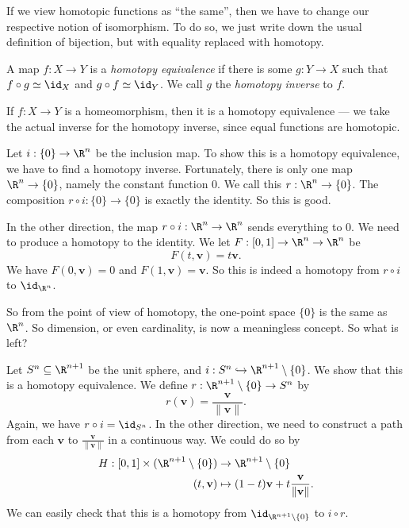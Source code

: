 \documentclass[a4paper]{article}
\begin{document}
If we view homotopic functions as ``the same'', then we have to change our respective notion of isomorphism. To do so, we just write down the usual definition of bijection, but with equality replaced with homotopy.

\begin{defi}
  A map $f: X \to Y$ is a \emph{homotopy equivalence} if there is some $g: Y \to X$ such that $f \circ g \simeq \id_X$ and $g \circ f \simeq \id_Y$. We call $g$ the \emph{homotopy inverse} to $f$.
\end{defi}

\begin{eg}
  If $f: X \to Y$ is a homeomorphism, then it is a homotopy equivalence --- we take the actual inverse for the homotopy inverse, since equal functions are homotopic.
\end{eg}

\begin{eg}
  Let $i: \{0\} \to \R^n$ be the inclusion map. To show this is a homotopy equivalence, we have to find a homotopy inverse. Fortunately, there is only one map $\R^n \to \{0\}$, namely the constant function $0$. We call this $r: \R^n \to \{0\}$. The composition $r \circ i: \{0\} \to \{0\}$ is exactly the identity. So this is good.

  In the other direction, the map $r \circ i: \R^n \to \R^n$ sends everything to $0$. We need to produce a homotopy to the identity. We let $F: [0, 1] \to \R^n \to \R^n$ be
  \[
    F(t, \mathbf{v}) = t\mathbf{v}.
  \]
  We have $F(0, \mathbf{v}) = 0$ and $F(1, \mathbf{v}) = \mathbf{v}$. So this is indeed a homotopy from $r \circ i$ to $\id_{\R^n}$.
\end{eg}

So from the point of view of homotopy, the one-point space $\{0\}$ is the same as $\R^n$. So dimension, or even cardinality, is now a meaningless concept. So what is left?

\begin{eg}
  Let $S^n \subseteq \R^{n + 1}$ be the unit sphere, and $i: S^n \hookrightarrow \R^{n + 1} \setminus \{0\}$. We show that this is a homotopy equivalence. We define $r: \R^{n + 1} \setminus \{0\} \to S^n$ by
  \[
    r(\mathbf{v}) = \frac{\mathbf{v}}{\|\mathbf{v}\|}.
  \]
  Again, we have $r \circ i = \id_{S^n}$. In the other direction, we need to construct a path from each $\mathbf{v}$ to $\frac{\mathbf{v}}{\|\mathbf{v}\|}$ in a continuous way. We could do so by
  \begin{align*}
    H: [0, 1] \times (\R^{n + 1} \setminus \{0\}) &\to \R^{n + 1} \setminus \{0\}\\
    (t, \mathbf{v}) &\mapsto (1 - t) \mathbf{v} + t \frac{\mathbf{v}}{\|\mathbf{v}\|}.
  \end{align*}
  We can easily check that this is a homotopy from $\id_{\R^{n + 1}\setminus \{0\}}$ to $i \circ r$.
\end{eg}
\end{document}
